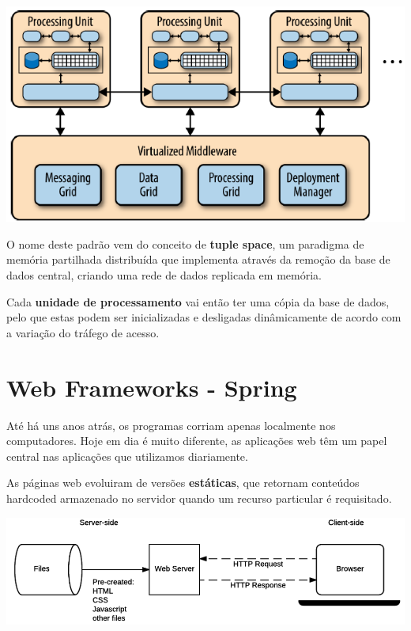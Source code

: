 \documentclass{article}
\begin{document}
\begin{center}
  \includegraphics[scale=0.5]{71}
\end{center}

O nome deste padrão vem do conceito de \textbf{tuple space}, um paradigma de memória partilhada
distribuída que implementa através da remoção da base de dados central, criando uma rede
de dados replicada em memória.

\vspace{2mm}

Cada \textbf{unidade de processamento} vai então ter uma cópia da base de dados, pelo que estas
podem ser inicializadas e desligadas dinâmicamente de acordo com a variação do tráfego de
acesso.

\pagebreak

\section{Web Frameworks - Spring}

Até há uns anos atrás, os programas corriam apenas localmente nos computadores.
Hoje em dia é muito diferente, as aplicações web têm um papel central nas
aplicações que utilizamos diariamente.

\vspace{2mm}

As páginas web evoluiram de versões \textbf{estáticas}, que
retornam conteúdos hardcoded armazenado no servidor quando um
recurso particular é requisitado.

\begin{center}
  \includegraphics[scale=0.45]{72}
\end{center}
\end{document}

